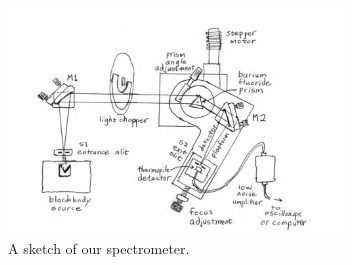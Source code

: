 \documentclass[10pt,letterpaper,onecolumn]{article}
\begin{document}
\begin{figure}[ht]
  \begin{center}
  \includegraphics*[width=3.5in]{Apparatus_2.png}
  \caption{A sketch of our spectrometer.\label{fig:apparatus_2} }
  \end{center}
 \end{figure}
\end{document}
